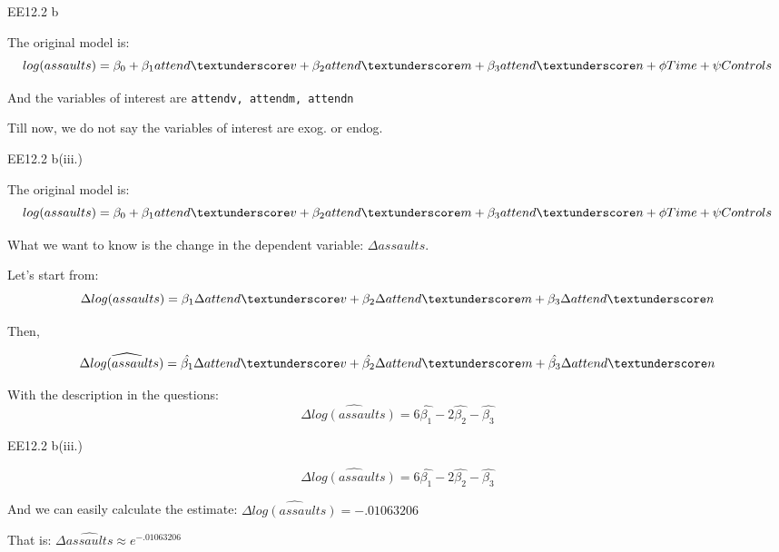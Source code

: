 \begin{frame}[fragile]{EE12.2 b}

The original model is:
$$log(assaults) = \beta_0 + \beta_1 attend\textunderscore v +\beta_2 attend\textunderscore m+\beta_3 attend\textunderscore n+ \phi Time+\psi Controls$$

And the variables of interest are \texttt{attend\textunderscore v, attend\textunderscore m, attend\textunderscore n}

Till now, we do not say the variables of interest are exog. or endog.

\end{frame}


\begin{frame}[fragile]{EE12.2 b(iii.)}

The original model is:
$$log(assaults) = \beta_0 + \beta_1 attend\textunderscore v +\beta_2 attend\textunderscore m+\beta_3 attend\textunderscore n+ \phi Time+\psi Controls$$

What we want to know is the change in the dependent variable: $\Delta assaults$.

Let's start from: 
$$\Delta log(assaults) = {\beta_1} \Delta attend\textunderscore v + {\beta_2} \Delta attend\textunderscore m+{\beta_3} \Delta attend\textunderscore n$$

Then,

$$\Delta \widehat{log(assaults)} = \hat{\beta_1} \Delta attend\textunderscore v + \hat{\beta_2} \Delta attend\textunderscore m+\hat{\beta_3} \Delta attend\textunderscore n$$

With the description in the questions:
$$\Delta \widehat{log(assaults)} = 6\hat{\beta_1} - 2 \hat{\beta_2}-\hat{\beta_3}$$

\end{frame}


\begin{frame}[fragile]{EE12.2 b(iii.)}

$$\Delta \widehat{log(assaults)} = 6\hat{\beta_1} - 2 \hat{\beta_2}-\hat{\beta_3}$$

And we can easily calculate the estimate: $\Delta \widehat{log(assaults)} = -.01063206$

That is: $\Delta \widehat{assaults} \approx e^{-.01063206}$

\end{frame}


